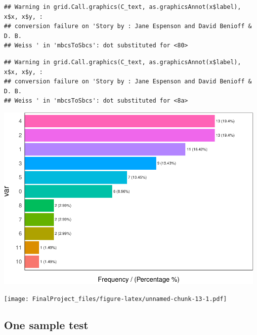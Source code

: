 \documentclass[]{article}
\newenvironment{Shaded}{\begin{snugshade}}{\end{snugshade}}
\newcommand{\KeywordTok}[1]{\textcolor[rgb]{0.13,0.29,0.53}{\textbf{#1}}}
\newcommand{\NormalTok}[1]{#1}
\newcommand{\OperatorTok}[1]{\textcolor[rgb]{0.81,0.36,0.00}{\textbf{#1}}}
\newcommand{\StringTok}[1]{\textcolor[rgb]{0.31,0.60,0.02}{#1}}
\begin{document}
\begin{verbatim}
## Warning in grid.Call.graphics(C_text, as.graphicsAnnot(x$label), x$x, x$y, :
## conversion failure on 'Story by : Jane Espenson and David Benioff & D. B.
## Weiss ' in 'mbcsToSbcs': dot substituted for <80>
\end{verbatim}

\begin{verbatim}
## Warning in grid.Call.graphics(C_text, as.graphicsAnnot(x$label), x$x, x$y, :
## conversion failure on 'Story by : Jane Espenson and David Benioff & D. B.
## Weiss ' in 'mbcsToSbcs': dot substituted for <8a>
\end{verbatim}

\includegraphics{FinalProject_files/figure-latex/unnamed-chunk-12-1.pdf}

\begin{Shaded}
\end{Shaded}

\texttt{[image: FinalProject\_files/figure-latex/unnamed-chunk-13-1.pdf]}

\hypertarget{one-sample-test}{%
\subsection{One sample test}\label{one-sample-test}}
\end{document}
